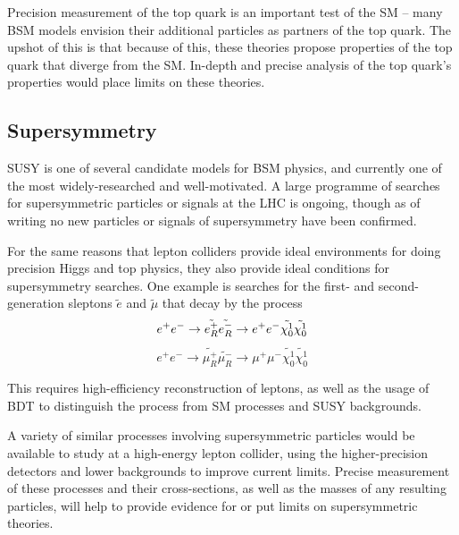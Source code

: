 Precision measurement of the top quark is an important test of the \acrshort{SM} -- many \acrshort{BSM} models envision their additional particles as partners of the top quark. The upshot of this is that because of this, these theories propose properties of the top quark that diverge from the SM. In-depth and precise analysis of the top quark's properties would place limits on these theories.

\subsection{Supersymmetry}
\acrfull{SUSY} is one of several candidate models for \acrshort{BSM} physics, and currently one of the most widely-researched and well-motivated. A large programme of searches for supersymmetric particles or signals at the \acrshort{LHC} is ongoing, though as of writing no new particles or signals of supersymmetry have been confirmed.

For the same reasons that lepton colliders provide ideal environments for doing precision Higgs and top physics, they also provide ideal conditions for supersymmetry searches. One example is searches for the first- and second-generation sleptons $\tilde{e}$ and $\tilde{\mu}$ that decay by the process
$$
		e^+ e^- \rightarrow \tilde{e_R^+} \tilde{e_R^-} \rightarrow e^+ e^- \tilde{\chi_0^1} \tilde{\chi_0^1} \\
$$
$$
		e^+ e^- \rightarrow \tilde{\mu_R^+} \tilde{\mu_R^-} \rightarrow \mu^+ \mu^- \tilde{\chi_0^1} \tilde{\chi_0^1}
$$

This requires high-efficiency reconstruction of leptons, as well as the usage of \acrfull{BDT} to distinguish the process from \acrshort{SM} processes and \acrshort{SUSY} backgrounds. 

A variety of similar processes involving supersymmetric particles would be available to study at a high-energy lepton collider, using the higher-precision detectors and lower backgrounds to improve current limits. Precise measurement of these processes and their cross-sections, as well as the masses of any resulting particles, will help to provide evidence for or put limits on supersymmetric theories.


